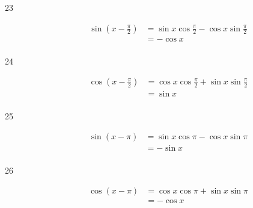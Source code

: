 \documentclass{exam}
\begin{document}
\begin{description}

      \item[23] 
        \begin{align*}
          \sin \left( x - \frac{\pi}{2} \right) & = \sin x \cos \frac{\pi}{2} - \cos x \sin \frac{\pi}{2} \\
                                                & = - \cos x \\
        \end{align*}

      \item[24] 
        \begin{align*}
          \cos \left( x - \frac{\pi}{2} \right) & = \cos x \cos \frac{\pi}{2} + \sin x \sin \frac{\pi}{2} \\
                                                & = \sin x \\
        \end{align*}

      \item[25] 
        \begin{align*}
          \sin(x - \pi) & = \sin x \cos \pi - \cos x \sin \pi \\
                        & = - \sin x \\
        \end{align*}

      \item[26] 
        \begin{align*}
          \cos(x - \pi) & = \cos x \cos \pi + \sin x \sin \pi \\
                        & = - \cos x \\
        \end{align*}


\end{description}
\end{document}

